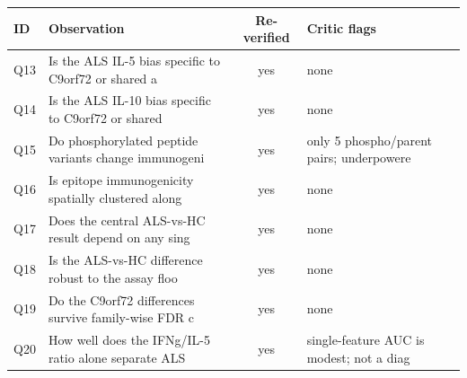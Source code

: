 \begin{tabular}{llcp{5.4cm}}
\toprule
ID & Observation & Re-verified & Critic flags \\
\midrule
Q13 & Is the ALS IL-5 bias specific to C9orf72 or shared a & yes & none \\
Q14 & Is the ALS IL-10 bias specific to C9orf72 or shared  & yes & none \\
Q15 & Do phosphorylated peptide variants change immunogeni & yes & only 5 phospho/parent pairs; underpowere \\
Q16 & Is epitope immunogenicity spatially clustered along  & yes & none \\
Q17 & Does the central ALS-vs-HC result depend on any sing & yes & none \\
Q18 & Is the ALS-vs-HC difference robust to the assay floo & yes & none \\
Q19 & Do the C9orf72 differences survive family-wise FDR c & yes & none \\
Q20 & How well does the IFNg/IL-5 ratio alone separate ALS & yes & single-feature AUC is modest; not a diag \\
\bottomrule
\end{tabular}
